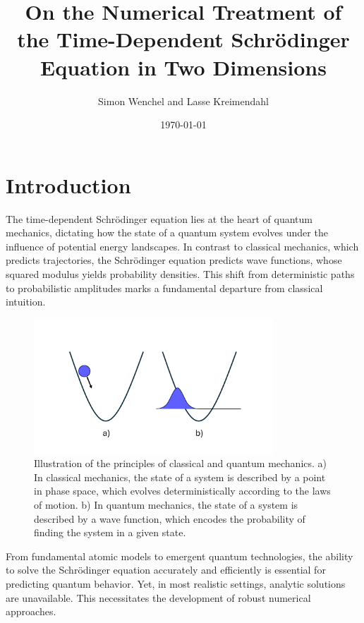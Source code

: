 \documentclass{article}
\theoremstyle{definition}
\theoremstyle{plain}
\theoremstyle{remark}
\begin{document}
\title{On the Numerical Treatment of the Time-Dependent Schrödinger Equation in Two Dimensions}
\author{Simon Wenchel and Lasse Kreimendahl}
\date{\today}
\maketitle

\tableofcontents

\newpage

\section{Introduction}

The time-dependent Schrödinger equation lies at the heart of quantum mechanics, dictating how the state of a quantum system evolves under the influence of potential energy landscapes. In contrast to classical mechanics, which predicts trajectories, the Schrödinger equation predicts wave functions, whose squared modulus yields probability densities. This shift from deterministic paths to probabilistic amplitudes marks a fundamental departure from classical intuition.

\begin{figure}[h]
    \centering
    \includegraphics[width=0.8\textwidth]{figures/Figure1.pdf}
    \caption{Illustration of the principles of classical and quantum mechanics. a) In classical mechanics, the state of a system is described by a point in phase space, which evolves deterministically according to the laws of motion. b) In quantum mechanics, the state of a system is described by a wave function, which encodes the probability of finding the system in a given state.}
    \label{fig:fig1}
\end{figure}

From fundamental atomic models to emergent quantum technologies, the ability to solve the Schrödinger equation accurately and efficiently is essential for predicting quantum behavior. Yet, in most realistic settings, analytic solutions are unavailable. This necessitates the development of robust numerical approaches.
\end{document}
